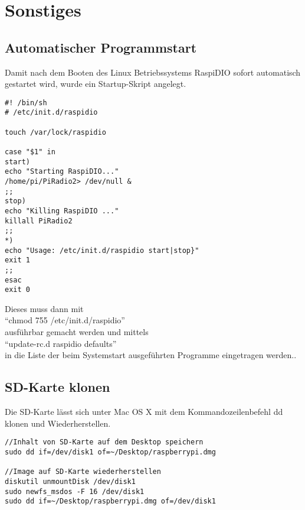 \section{Sonstiges}
\subsection{Automatischer Programmstart}
Damit nach dem Booten des Linux Betriebssystems RaspiDIO sofort automatisch gestartet wird, wurde ein Startup-Skript angelegt.
\begin{lstlisting}[label=startup,caption=/etc/init.d/raspidio]
#! /bin/sh
# /etc/init.d/raspidio

touch /var/lock/raspidio

case "$1" in
start)
echo "Starting RaspiDIO..."
/home/pi/PiRadio2> /dev/null &
;;
stop)
echo "Killing RaspiDIO ..."
killall PiRadio2
;;
*)
echo "Usage: /etc/init.d/raspidio start|stop}"
exit 1
;;
esac
exit 0
\end{lstlisting}
Dieses muss dann mit \\
"`chmod 755 /etc/init.d/raspidio"'\\
ausführbar gemacht werden und mittels \\
"`update-rc.d raspidio defaults"' \\
in die Liste der beim Systemstart ausgeführten Programme eingetragen werden..
\subsection{SD-Karte klonen}
Die SD-Karte lässt sich unter Mac OS X mit dem Kommandozeilenbefehl dd klonen und Wiederherstellen.
\begin{lstlisting}[label=clone,caption=Klonen und Wiederherstellen der SD-Karte]
//Inhalt von SD-Karte auf dem Desktop speichern
sudo dd if=/dev/disk1 of=~/Desktop/raspberrypi.dmg

//Image auf SD-Karte wiederherstellen
diskutil unmountDisk /dev/disk1
sudo newfs_msdos -F 16 /dev/disk1
sudo dd if=~/Desktop/raspberrypi.dmg of=/dev/disk1
\end{lstlisting}